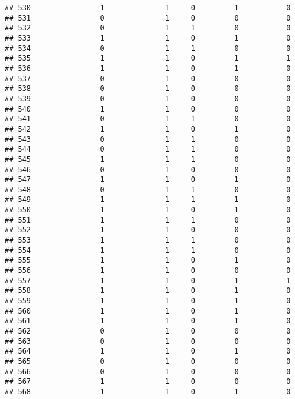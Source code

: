 \documentclass[]{article}
\begin{document}
\begin{verbatim}
## 530                1              1     0         1           0
## 531                0              1     0         0           0
## 532                0              1     1         0           0
## 533                1              1     0         1           0
## 534                0              1     1         0           0
## 535                1              1     0         1           1
## 536                1              1     0         1           0
## 537                0              1     0         0           0
## 538                0              1     0         0           0
## 539                0              1     0         0           0
## 540                1              1     0         0           0
## 541                0              1     1         0           0
## 542                1              1     0         1           0
## 543                0              1     1         0           0
## 544                0              1     1         0           0
## 545                1              1     1         0           0
## 546                0              1     0         0           0
## 547                1              1     0         1           0
## 548                0              1     1         0           0
## 549                1              1     1         1           0
## 550                1              1     0         1           0
## 551                1              1     1         0           0
## 552                1              1     0         0           0
## 553                1              1     1         0           0
## 554                1              1     1         0           0
## 555                1              1     0         1           0
## 556                1              1     0         0           0
## 557                1              1     0         1           1
## 558                1              1     0         1           0
## 559                1              1     0         1           0
## 560                1              1     0         1           0
## 561                1              1     0         1           0
## 562                0              1     0         0           0
## 563                0              1     0         0           0
## 564                1              1     0         1           0
## 565                0              1     0         0           0
## 566                0              1     0         0           0
## 567                1              1     0         0           0
## 568                1              1     0         1           0

\end{verbatim}
\end{document}
